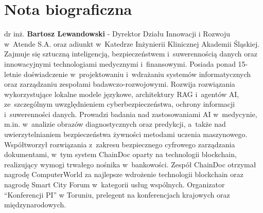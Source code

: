 \documentclass[12pt,a4paper]{article}
\begin{document}
\printbibliography

\section*{Nota biograficzna}

{\footnotesize{}
dr inż. \textbf{Bartosz Lewandowski} - Dyrektor Działu Innowacji i Rozwoju w~Atende S.A. 
oraz adiunkt w~Katedrze Inżynierii Klinicznej Akademii Śląskiej. 
Zajmuje się sztuczną inteligencją, bezpieczeństwem i~suwerennością danych oraz innowacyjnymi 
technologiami medycznymi i~finansowymi. 
Posiada ponad 15-letnie doświadczenie w~projektowaniu i~wdrażaniu
systemów informatycznych oraz zarządzaniu zespołami
badawczo-rozwojowymi. Rozwija rozwiązania wykorzystujące lokalne
modele językowe, architektury RAG i~agentów AI, ze~szczególnym
uwzględnieniem cyberbezpieczeństwa, ochrony informacji
i~suwerenności danych. Prowadzi badania nad zastosowaniami AI w~medycynie, m.in. w~analizie obrazów diagnostycznych oraz predykcji,
a~także nad uwierzytelnianiem bezpieczeństwa żywności metodami uczenia maszynowego. 
Współtworzył rozwiązania z~zakresu bezpiecznego cyfrowego zarządzania dokumentami, 
w~tym system ChainDoc oparty na technologii blockchain, realizujący wymogi trwałego nośnika w~bankowości. 
Zespół ChainDoc otrzymał nagrodę ComputerWorld za najlepsze wdrożenie technologii blockchain 
oraz nagrodę Smart City Forum w~kategorii usług wspólnych. 
Organizator \enquote{Konferencji PI} w Toruniu, prelegent na konferencjach krajowych oraz międzynarodowych.

\par}
\end{document}
